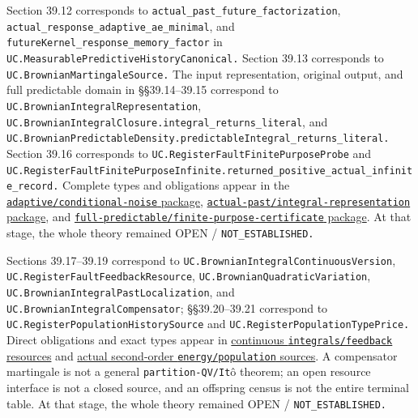 \documentclass[
  english,
  11pt,
  oneside]{book}
\begin{document}
Section 39.12 corresponds to \nolinkurl{actual_past_future_factorization}, \nolinkurl{actual_response_adaptive_ae_minimal}, and \nolinkurl{futureKernel_response_memory_factor} in \nolinkurl{UC.MeasurablePredictiveHistoryCanonical.} Section 39.13 corresponds to \nolinkurl{UC.BrownianMartingaleSource.} The input representation, original output, and full predictable domain in §§39.14--39.15 correspond to \nolinkurl{UC.BrownianIntegralRepresentation}, \nolinkurl{UC.BrownianIntegralClosure.integral_returns_literal}, and \nolinkurl{UC.BrownianPredictableDensity.predictableIntegral_returns_literal.} Section 39.16 corresponds to \nolinkurl{UC.RegisterFaultFinitePurposeProbe} and \nolinkurl{UC.RegisterFaultFinitePurposeInfinite.returned_positive_actual_infinite_record.} Complete types and obligations appear in the \href{../formalization/ueot-core/docs/compression/theory_completion/unified_closure/adaptive_stochastic_sources_v1/RESULTS_AND_OPEN_OBLIGATIONS.md}{\nolinkurl{adaptive/conditional-noise} package}, \href{../formalization/ueot-core/docs/compression/theory_completion/unified_closure/history_integral_source_v1/RESULTS_AND_OPEN_OBLIGATIONS.md}{\nolinkurl{actual-past/integral-representation} package}, and \href{../formalization/ueot-core/docs/compression/theory_completion/unified_closure/predictable_finite_purpose_v1/RESULTS_AND_OPEN_OBLIGATIONS.md}{\nolinkurl{full-predictable/finite-purpose-certificate} package}. At that stage, the whole theory remained OPEN / \nolinkurl{NOT_ESTABLISHED.}

Sections 39.17--39.19 correspond to \nolinkurl{UC.BrownianIntegralContinuousVersion}, \nolinkurl{UC.RegisterFaultFeedbackResource}, \nolinkurl{UC.BrownianQuadraticVariation}, \nolinkurl{UC.BrownianIntegralPastLocalization}, and \nolinkurl{UC.BrownianIntegralCompensator}; §§39.20--39.21 correspond to \nolinkurl{UC.RegisterPopulationHistorySource} and \nolinkurl{UC.RegisterPopulationTypePrice.} Direct obligations and exact types appear in \href{../formalization/ueot-core/docs/compression/theory_completion/unified_closure/continuous_resource_source_v1/RESULTS_AND_OPEN_OBLIGATIONS.md}{continuous \nolinkurl{integrals/feedback} resources} and \href{../formalization/ueot-core/docs/compression/theory_completion/unified_closure/compensator_population_source_v1/RESULTS_AND_OPEN_OBLIGATIONS.md}{actual second-order \nolinkurl{energy/population} sources}. A compensator martingale is not a general \nolinkurl{partition-QV/It}ô theorem; an open resource interface is not a closed source, and an offspring census is not the entire terminal table. At that stage, the whole theory remained OPEN / \nolinkurl{NOT_ESTABLISHED.}
\end{document}
